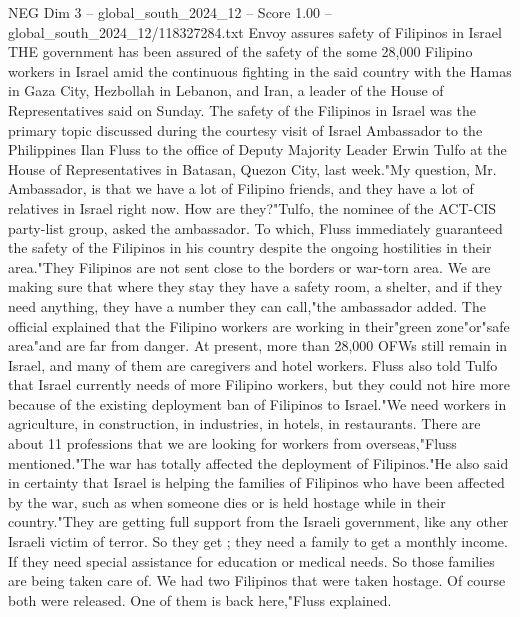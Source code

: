 \begin{textsample}{NEG Dim 3 – global\_south\_2024\_12 – Score 1.00 – global\_south\_2024\_12/118327284.txt}  \label{ex:f3_neg_064}
Envoy assures safety of Filipinos in Israel THE government has been assured of the safety of the some 28,000 Filipino workers in Israel amid the continuous fighting in the said country with the Hamas in Gaza City, Hezbollah in Lebanon, and Iran, a leader of the House of Representatives said on Sunday.
The safety of the Filipinos in Israel was the primary topic discussed during the courtesy visit of Israel Ambassador to the Philippines Ilan Fluss to the office of Deputy Majority Leader Erwin Tulfo at the House of Representatives in Batasan, Quezon City, last week."My question, Mr.
Ambassador, is that we have a lot of Filipino friends, and they have a lot of relatives in Israel right now.
How are they?"Tulfo, the nominee of the ACT-CIS party-list group, asked the ambassador.
To which, Fluss immediately guaranteed the safety of the Filipinos in his country despite the ongoing hostilities in their area."They Filipinos are not sent close to the borders or war-torn area.
We are making sure that where they stay they have a safety room, a shelter, and if they need anything, they have a number they can call,"the ambassador added.
The official explained that the Filipino workers are working in their"green zone"or"safe area"and are far from danger.
At present, more than 28,000 OFWs still remain in Israel, and many of them are caregivers and hotel workers.
Fluss also told Tulfo that Israel currently needs of more Filipino workers, but they could not hire more because of the existing deployment ban of Filipinos to Israel."We need workers in agriculture, in construction, in industries, in hotels, in restaurants.
There are about 11 professions that we are looking for workers from overseas,"Fluss mentioned."The war has totally affected the deployment of Filipinos."He also said in certainty that Israel is helping the families of Filipinos who have been affected by the war, such as when someone dies or is held hostage while in their country."They are getting full support from the Israeli government, like any other Israeli victim of terror.
So they get ; they need a family to get a monthly income.
If they need special assistance for education or medical needs.
So those families are being taken care of.
We had two Filipinos that were taken hostage.
Of course both were released.
One of them is back here,"Fluss explained.

\end{textsample}
